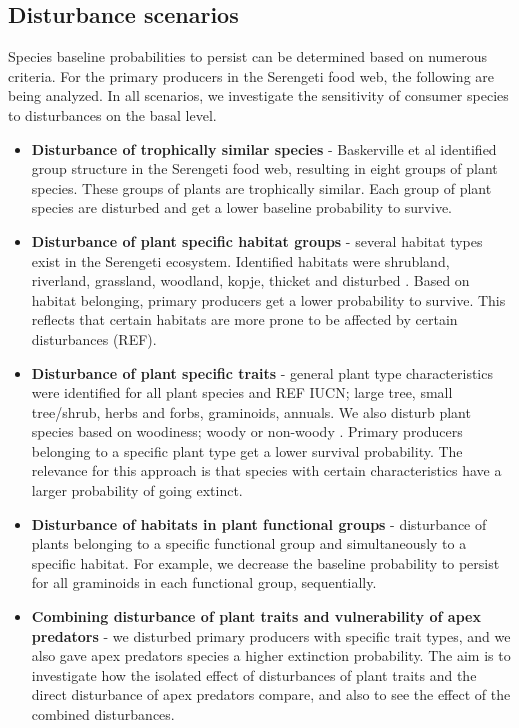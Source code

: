 \documentclass[a4paper,11pt]{article}
\begin{document}
\subsection*{Disturbance scenarios}
Species baseline probabilities to persist can be determined based on numerous criteria. For the primary producers in the Serengeti food web, the following are being analyzed. In all scenarios, we investigate the sensitivity of consumer species to disturbances on the basal level.
\begin{itemize}
  \item \textbf{Disturbance of trophically similar species} - Baskerville et al \citep{Baskervilleetal2011} identified group structure in the Serengeti food web, resulting in eight groups of plant species. These groups of plants are trophically similar. Each group of plant species are disturbed and get a lower baseline probability to survive. 
  \item \textbf{Disturbance of plant specific habitat groups} - several habitat types exist in the Serengeti ecosystem. Identified habitats were shrubland, riverland, grassland, woodland, kopje, thicket and disturbed \citep{Baskervilleetal2011}. Based on habitat belonging, primary producers get a lower probability to survive. This reflects that certain habitats are more prone to be affected by certain disturbances (REF). 
  \item \textbf{Disturbance of plant specific traits} - general plant type characteristics were identified for all plant species \citep{Dressleretal2014} and REF IUCN; large tree, small tree/shrub, herbs and forbs, graminoids, annuals. We also disturb plant species based on woodiness; woody or non-woody \citep{Dressleretal2014}. Primary producers belonging to a specific plant type get a lower survival probability. The relevance for this approach is that species with certain characteristics have a larger probability of going extinct. 
  \item \textbf{Disturbance of habitats in plant functional groups} - disturbance of plants belonging to a specific functional group and simultaneously to a specific habitat. For example, we decrease the baseline probability to persist for all graminoids in each functional group, sequentially. 
  \item \textbf{Combining disturbance of plant traits and vulnerability of apex predators} - we disturbed primary producers with specific trait types, and we also gave apex predators species a higher extinction probability. The aim is to investigate how the isolated effect of disturbances of plant traits and the direct disturbance of apex predators compare, and also to see the effect of the combined disturbances. 
\end{itemize}
\end{document}
